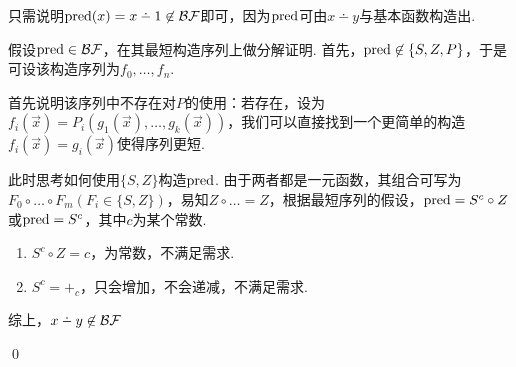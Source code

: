 \begin{pf} \rm 
    只需说明$\pred(x)=x\dotminus1\not\in\BF$即可，因为$\mathrm{pred}$可由$x\dotminus y$与基本函数构造出.

    假设$\mathrm{pred}\in\mathcal{BF}$，在其最短构造序列上做分解证明. 首先，$\mathrm{pred}\not\in\{S,Z,P\}$，于是可设该构造序列为$f_0,\dots,f_n$. 
    
    首先说明该序列中不存在对$P$的使用：若存在，设为\\$f_i(\vec{x})=P_i(g_1(\vec{x}),\dots,g_k(\vec{x}))$，我们可以直接找到一个更简单的构造$f_i(\vec{x})=g_i(\vec{x})$使得序列更短.

    此时思考如何使用$\{S,Z\}$构造$\mathrm{pred}$. 由于两者都是一元函数，其组合可写为$F_0\circ\dots\circ F_m(F_i\in\{S,Z\})$，易知$Z\circ\dots=Z$，根据最短序列的假设，$\mathrm{pred}=S^c\circ Z$或$\mathrm{pred}=S^c$，其中$c$为某个常数.

    \begin{enumerate}
        \item $S^c\circ Z=c$，为常数，不满足需求.
        \item $S^c = +_c$，只会增加，不会递减，不满足需求.
    \end{enumerate}

    综上，$x\dotminus y\not\in\BF$

    \qed
\end{pf}
